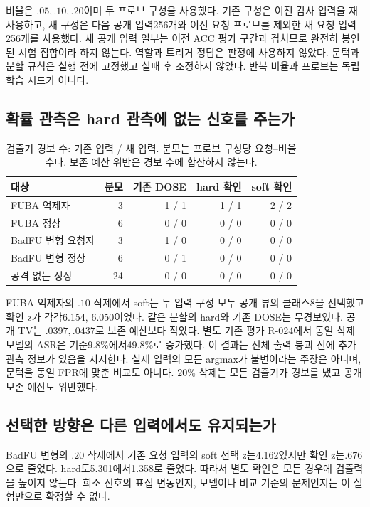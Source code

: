 \documentclass[10pt,a4paper]{article}
\begin{document}
비율은 $.05,.10,.20$이며 두 프로브 구성을 사용했다.
기존 구성은 이전 감사 입력을 재사용하고, 새 구성은 다음 공개 입력256개와
이전 요청 프로브를 제외한 새 요청 입력256개를 사용했다.
새 공개 입력 일부는 이전 ACC 평가 구간과 겹치므로 완전히 봉인된 시험 집합이라 하지 않는다.
역할과 트리거 정답은 판정에 사용하지 않았다.
문턱과 분할 규칙은 실행 전에 고정했고 실패 후 조정하지 않았다.
반복 비율과 프로브는 독립 학습 시드가 아니다.

\subsection{확률 관측은 hard 관측에 없는 신호를 주는가}
\begin{table}[ht]\centering\small
\caption{검출기 경보 수: 기존 입력 / 새 입력. 분모는 프로브 구성당 요청--비율 수다.
보존 예산 위반은 경보 수에 합산하지 않는다.}
\begin{tabular}{lrrrr}\toprule
대상 & 분모 & 기존 DOSE & hard 확인 & soft 확인\\\midrule
FUBA 억제자 & 3 & 1 / 1 & 1 / 1 & 2 / 2\\
FUBA 정상 & 6 & 0 / 0 & 0 / 0 & 0 / 0\\
BadFU 변형 요청자 & 3 & 1 / 0 & 0 / 0 & 0 / 0\\
BadFU 변형 정상 & 6 & 0 / 1 & 0 / 0 & 0 / 0\\
공격 없는 정상 & 24 & 0 / 0 & 0 / 0 & 0 / 0\\\bottomrule
\end{tabular}
\end{table}

FUBA 억제자의 $.10$ 삭제에서 soft는 두 입력 구성 모두 공개 뷰의 클래스8을 선택했고
확인 z가 각각6.154, 6.050이었다. 같은 분할의 hard와 기존 DOSE는 무경보였다.
공개 TV는 $.0397,.0437$로 보존 예산보다 작았다.
별도 기존 평가 R-024에서 동일 삭제 모델의 ASR은 기준9.8\%에서49.8\%로 증가했다.
이 결과는 전체 출력 붕괴 전에 추가 관측 정보가 있음을 지지한다.
실제 입력의 모든 argmax가 불변이라는 주장은 아니며, 문턱을 동일 FPR에 맞춘 비교도 아니다.
$20\%$ 삭제는 모든 검출기가 경보를 냈고 공개 보존 예산도 위반했다.

\subsection{선택한 방향은 다른 입력에서도 유지되는가}
BadFU 변형의 $.20$ 삭제에서 기존 요청 입력의 soft 선택 z는4.162였지만
확인 z는$.676$으로 줄었다. hard도5.301에서1.358로 줄었다.
따라서 별도 확인은 모든 경우에 검출력을 높이지 않는다.
희소 신호의 표집 변동인지, 모델이나 비교 기준의 문제인지는 이 실험만으로 확정할 수 없다.
\end{document}
